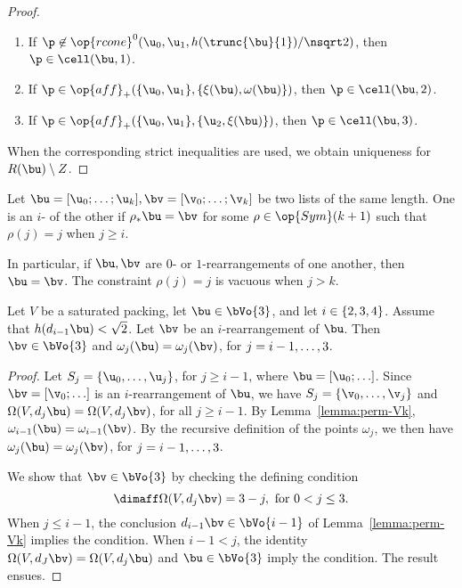 \begin{cnl}
\begin{proof}
\begin{enumerate}
\item
If $\p\not\in\op{rcone}^0(\u_0,\u_1,h(\trunc{\bu}{1})/\nsqrt2)$, then
 $\p\in \cell(\bu,1)$.

\item
If $\p\in \op{aff}_+(\braced{\u_0,\u_1},\braced{\xi(\bu),\omega(\bu)})$, then
 $\p\in \cell(\bu,2)$.

\item If $\p\in \op{aff}_+(\braced{\u_0,\u_1},\braced{\u_2,\xi(\bu)})$, then
  $\p\in \cell(\bu,3)$.
\end{enumerate}
When the corresponding strict inequalities are used, we obtain
uniqueness for $R(\bu)\setminus Z$.
\end{proof}


\begin{definition}[$i$-rearrangement]
\label{def:i-rearrangement}
%
Let $\bu=\listdots{\u}{0}{k},\bv=\listdots{\v}{0}{k}$ be two lists of
the same length.  One is an $i$- of the other
if $\rho_*\bu = \bv$ for some $\rho\in\op{Sym}(k+1)$ such that
$\rho(j) = j$ when $j \ge i$.
\end{definition}

In particular, if $\bu,\bv$ are $0$- or $1$-rearrangements of one
another, then $\bu = \bv$.  The constraint $\rho(j)=j$ is vacuous when
$j>k$.


\begin{lemma}[]
\label{lemma:i-omega} %
%
Let $V$ be a saturated packing, let $\bu\in \bVo{3}$, and let
$i\in\{2,3,4\}$.  Assume that $h(d_{i-1}\bu)<\sqrt2$.  Let $\bv$
be an $i$-rearrangement of $\bu$.  Then $\bv\in \bVo{3}$ and
$\omega_j(\bu)=\omega_j(\bv)$, for $j=i-1,\ldots,3$.
\end{lemma}


\begin{proof}
Let $S_j =\setenumdots{\u}{0}{j}$, for $j\ge i-1$, where
$\bu=[\u_0;\ldots]$.  Since $\bv=[\v_0;\ldots]$ is an
$i$-rearrangement of $\bu$, we have $S_j = \setenumdots{\v}{0}{j}$ and
$\Omega(V,d_j\bu) = \Omega(V,d_j\bv)$,
for all $j\ge i-1$. 
   By Lemma~\ref{lemma:perm-Vk},
  $\omega_{i-1}(\bu) = \omega_{i-1}(\bv)$.  By the recursive
  definition of the points $\omega_j$, we then have
  $\omega_j(\bu)=\omega_j(\bv)$, for $j=i-1,\ldots,3$.

  We show that $\bv\in \bVo{3}$ by checking the defining condition
\[
\dimaff \Omega(V,d_j\bv) = 3 - j, \text{ for } 0 < j \le 3.
\]
When $j\le i-1$, the conclusion $d_{i-1}\bv\in \bVo{i-1}$ of
Lemma~\ref{lemma:perm-Vk} implies the condition.  When $i-1<j$, the
identity $\Omega(V,d_J\bv)=\Omega(V,d_j\bu)$ and $\bu\in \bVo{3}$ imply
the condition.  The result ensues.
\end{proof}



\end{cnl}
